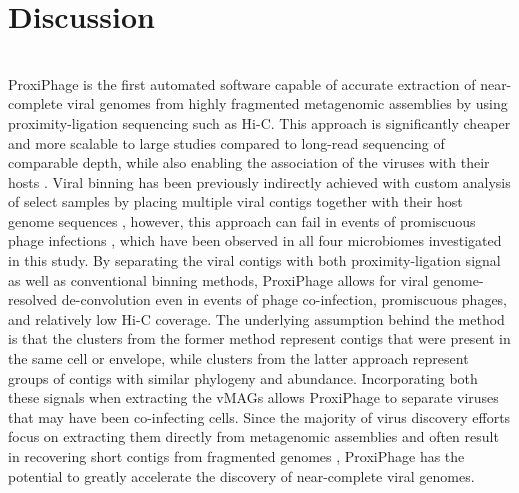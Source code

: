 \section*{Discussion} \hfill\\
ProxiPhage is the first automated software capable of accurate extraction of near-complete viral genomes from highly fragmented metagenomic assemblies by using proximity-ligation sequencing such as Hi-C. This approach is significantly cheaper and more scalable to large studies compared to long-read sequencing of comparable depth, while also enabling the association of the viruses with their hosts \cite{RN2968}. Viral binning has been previously indirectly achieved with custom analysis of select samples by placing multiple viral contigs together with their host genome sequences \cite{RN2974, RN2975, RN2976}, however, this approach can fail in events of promiscuous phage infections \cite{RN2979}, which have been observed in all four microbiomes investigated in this study. By separating the viral contigs with both proximity-ligation signal as well as conventional binning methods, ProxiPhage allows for viral genome-resolved de-convolution even in events of phage co-infection, promiscuous phages, and relatively low Hi-C coverage. The underlying assumption behind the method is that the clusters from the former method represent contigs that were present in the same cell or envelope, while clusters from the latter approach represent groups of contigs with similar phylogeny and abundance. Incorporating both these signals when extracting the vMAGs allows ProxiPhage to separate viruses that may have been co-infecting cells. Since the majority of virus discovery efforts focus on extracting them directly from metagenomic assemblies \cite{RN2986} and often result in recovering short contigs from fragmented genomes \cite{RN2987, RN2965}, ProxiPhage has the potential to greatly accelerate the discovery of near-complete viral genomes.

